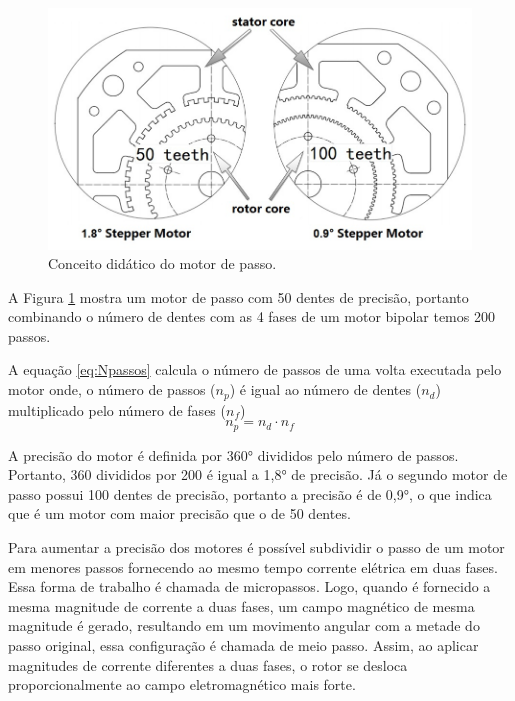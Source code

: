 \begin{figure}[H]
\centering
\caption{Conceito didático do motor de passo.}\label{fig:didaticopasso}
\includegraphics[scale = 0.4]{figuras/didaticopasso}
\end{figure}
    
A Figura \ref{fig:didaticopasso} mostra um motor de passo com 50 dentes de precisão, portanto combinando 
o número de dentes com as 4 fases de um motor bipolar temos 200 passos. 

A equação \ref{eq:Npassos} calcula o número de passos de uma volta executada pelo motor onde,
o número de passos ($n_{p}$) é igual ao número de dentes ($n_{d}$) multiplicado pelo número de fases ($n_{f}$)
\begin{equation}\label{eq:Npassos}
    n_{p} = n_{d} \cdot n_{f}
\end{equation}

A precisão do motor é definida por 360° divididos pelo número de passos. Portanto, 
360 divididos por 200 é igual a 1,8° de precisão. Já o segundo motor 
de passo possui 100 dentes de precisão, portanto a precisão é de 0,9°, o que indica que 
é um motor com maior precisão que o de 50 dentes.

Para aumentar a precisão dos motores é possível subdividir o passo de um motor em menores passos fornecendo 
ao mesmo tempo corrente elétrica em duas fases. Essa forma de trabalho é chamada de micropassos.
Logo, quando é fornecido a mesma magnitude de corrente a duas fases, um campo magnético de mesma magnitude 
é gerado, resultando em um movimento angular com a metade do passo original, essa configuração é chamada de 
meio passo. Assim, ao aplicar magnitudes de corrente diferentes a duas fases, o rotor se desloca 
proporcionalmente ao campo eletromagnético mais forte.

